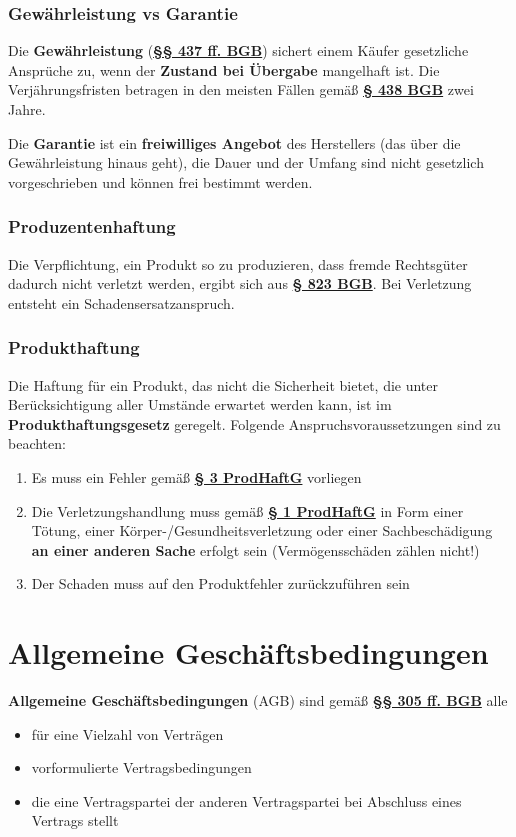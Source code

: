 \documentclass[12pt,A4]{extarticle}
\newcommand{\highlight}[1]{\textcolor{highlightColor}{\textbf{#1}}}
\newcommand{\bgb}[2][]{\textbf{\textcolor{gesetzLink}{\href{https://www.gesetze-im-internet.de/bgb/__#2.html}{§ #2 \ifthenelse{\equal{#1}{}}{}{#1 }BGB}}}}
\newcommand{\bgbb}[2][]{\textbf{\textcolor{gesetzLink}{\href{https://www.gesetze-im-internet.de/bgb/__#2.html}{§§ #1 BGB}}}}
\newcommand{\prodHaftG}[2][]{\textbf{\textcolor{gesetzLink}{\href{https://www.gesetze-im-internet.de/prodhaftg/__#2.html}{§ #2 \ifthenelse{\equal{#1}{}}{}{#1 }ProdHaftG}}}}
\begin{document}
\subsubsection{Gewährleistung vs Garantie}
Die \highlight{Gewährleistung} (\bgbb[437 ff.]{437}) sichert einem Käufer gesetzliche Ansprüche zu, wenn der \textbf{Zustand bei Übergabe} mangelhaft ist. Die Verjährungsfristen betragen in den meisten Fällen gemäß \bgb[Abs. 1]{438} zwei Jahre.\par
Die \highlight{Garantie} ist ein \textbf{freiwilliges Angebot} des Herstellers (das über die Gewährleistung hinaus geht), die Dauer und der Umfang sind nicht gesetzlich vorgeschrieben und können frei bestimmt werden.

\subsubsection{Produzentenhaftung}
Die Verpflichtung, ein Produkt so zu produzieren, dass fremde Rechtsgüter dadurch nicht verletzt werden, ergibt sich aus \bgb{823}. Bei Verletzung entsteht ein Schadensersatzanspruch.

\subsubsection{Produkthaftung}
Die Haftung für ein Produkt, das nicht die Sicherheit bietet, die unter Berücksichtigung aller Umstände erwartet werden kann, ist im \textbf{Produkthaftungsgesetz} geregelt. Folgende Anspruchsvoraussetzungen sind zu beachten:

\begin{enumerate}
  \item{Es muss ein Fehler gemäß \prodHaftG{3} vorliegen}
  \item{Die Verletzungshandlung muss gemäß \prodHaftG[Abs. 1]{1} in Form einer Tötung, einer Körper-/Gesundheitsverletzung oder einer Sachbeschädigung \textbf{an einer anderen Sache} erfolgt sein (Vermögensschäden zählen nicht!)}
  \item{Der Schaden muss auf den Produktfehler zurückzuführen sein}
\end{enumerate}

\section{Allgemeine Geschäftsbedingungen}
\highlight{Allgemeine Geschäftsbedingungen} (AGB) sind gemäß \bgbb[305 ff.]{305} alle

\begin{itemize}
  \item{für eine Vielzahl von Verträgen}
  \item{vorformulierte Vertragsbedingungen}
  \item{die eine Vertragspartei der anderen Vertragspartei bei Abschluss eines Vertrags stellt}
\end{itemize}
\end{document}

